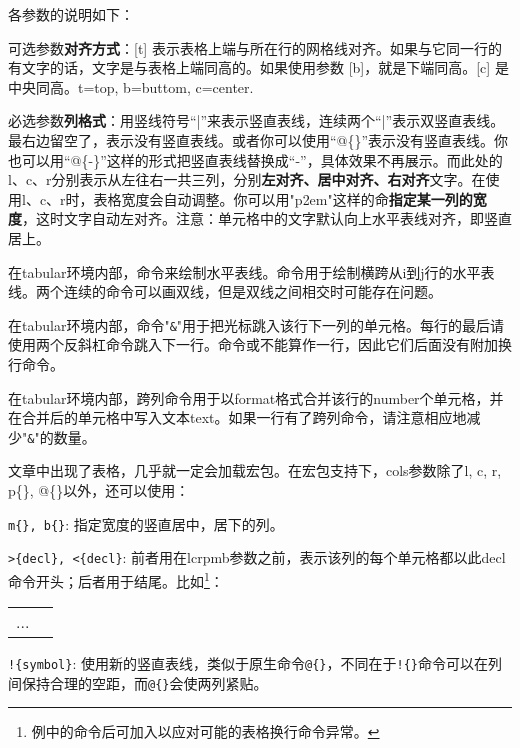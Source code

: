 各参数的说明如下：
\begin{feai}
\item 可选参数\textbf{对齐方式}：[t] 表示表格上端与所在行的网格线对齐。如果与它同一行的有文字的话，文字是与表格上端同高的。如果使用参数 [b]，就是下端同高。[c] 是中央同高。t=top, b=buttom, c=center.
\item 必选参数\textbf{列格式}：用竖线符号“|”来表示竖直表线，连续两个“|”表示双竖直表线。最右边留空了，表示没有竖直表线。或者你可以使用“@\{\}”表示没有竖直表线。你也可以用“@\{-\}”这样的形式把竖直表线替换成“-”，具体效果不再展示。而此处的l、c、r分别表示从左往右一共三列，分别\textbf{左对齐、居中对齐、右对齐}文字。在使用l、c、r时，表格宽度会自动调整。你可以用"p{2em}"这样的命\textbf{指定某一列的宽度}，这时文字自动左对齐。注意：单元格中的文字默认向上水平表线对齐，即竖直居上。
\item 在tabular环境内部，命令来绘制水平表线。命令用于绘制横跨从i到j行的水平表线。两个连续的命令可以画双线，但是双线之间相交时可能存在问题。
\item 在tabular环境内部，命令"\texttt{\&}"用于把光标跳入该行下一列的单元格。每行的最后请使用两个反斜杠命令跳入下一行。命令或不能算作一行，因此它们后面没有附加换行命令。
\item 在tabular环境内部，跨列命令用于以format格式合并该行的number个单元格，并在合并后的单元格中写入文本text。如果一行有了跨列命令，请注意相应地减少"\texttt{\&}"的数量。
\end{feai}

文章中出现了表格，几乎就一定会加载宏包。在宏包支持下，cols参数除了l, c, r, p\{\}, @\{\}以外，还可以使用：
\begin{feai}
\item \texttt{m\{\}, b\{\}}: 指定宽度的竖直居中，居下的列。
\item \verb|>{decl}, <{decl}|: 前者用在lcrpmb参数之前，表示该列的每个单元格都以此decl命令开头；后者用于结尾。比如\footnote{例中的命令后可加入以应对可能的表格换行命令异常。}：
\begin{latex}
\begin{tabular}{|>{\centering\ttfamily}p{5em}
    |>{$}c<{$}|}
...
\end{tabular}
\end{latex}
\item \verb|!{symbol}|:  使用新的竖直表线，类似于原生命令\texttt{@\{\}}，不同在于\verb|!{}|命令可以在列间保持合理的空距，而\verb|@{}|会使两列紧贴。
\end{feai}

